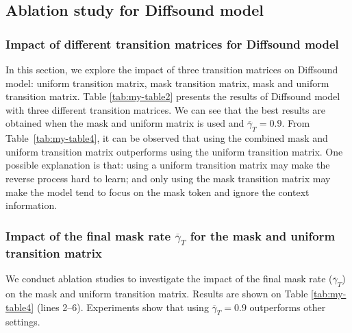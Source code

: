 \documentclass[lettersize,journal]{IEEEtran}
\begin{document}
\subsection{Ablation study for Diffsound model}
\subsubsection{Impact of different transition matrices for Diffsound model}
In this section, we explore the impact of three transition matrices on Diffsound model: uniform transition matrix, mask transition matrix, mask and uniform transition matrix. Table \ref{tab:my-table2} presents the results of Diffsound model with three different transition matrices. We can see that the best results are obtained when the mask and uniform matrix is used and $\overline{\gamma}_T=0.9$. 
{\color{black}From Table~\ref{tab:my-table4}, it can be observed that using the combined mask and uniform transition matrix outperforms using the uniform transition matrix. One possible explanation is that: using a uniform transition matrix may make the reverse process hard to learn; and only using the mask transition matrix may make the model tend to focus on the mask token and ignore the context information.}
\subsubsection{Impact of the final mask rate $\overline{\gamma}_T$ for the mask and uniform transition matrix} We conduct ablation studies to investigate the impact of the final mask rate ($\overline{\gamma}_T$) on the mask and uniform transition matrix. {\color{black}Results are shown on Table \ref{tab:my-table4} (lines 2–6). Experiments show that using $\overline{\gamma}_T=0.9$ outperforms other settings}. 
\end{document}
